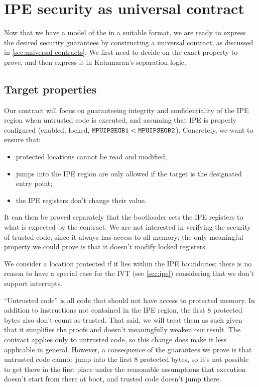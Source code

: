 \section{IPE security as universal contract}

Now that we have a model of the \msp in a suitable format, we are ready to express the desired security guarantees by constructing a universal contract, as discussed in \cref{sec:universal-contracts}. We first need to decide on the exact property to prove, and then express it in Katamaran's separation logic.

\subsection{Target properties}

Our contract will focus on guaranteeing integrity and confidentiality of the IPE region when untrusted code is executed, and assuming that IPE is properly configured (\ie enabled, locked, \(\reg{MPUIPSEGB1} < \reg{MPUIPSEGB2}\)). Concretely, we want to ensure that:
\begin{itemize}
\item protected locations cannot be read and modified;
\item jumps into the IPE region are only allowed if the target is the designated entry point;
\item the IPE registers don't change their value.
\end{itemize}

It can then be proved separately that the bootloader sets the IPE registers to what is expected by the contract. We are not interested in verifying the security of trusted code, since it always has access to all memory; the only meaningful property we could prove is that it doesn't modify locked registers.

We consider a location protected if it lies within the IPE boundaries; there is no reason to have a special case for the IVT (see \cref{sec:ipe}) considering that we don't support interrupts.

``Untrusted code'' is all code that should not have access to protected memory. In addition to instructions not contained in the IPE region, the first 8 protected bytes also don't count as trusted. That said, we will treat them as such given that it simplifies the proofs and doesn't meaningfully weaken our result. The contract applies only to untrusted code, so this change does make it less applicable in general. However, a consequence of the guarantees we prove is that untrusted code cannot jump into the first 8 protected bytes, so it's not possible to get there in the first place under the reasonable assumptions that execution doesn't start from there at boot, and trusted code doesn't jump there.

